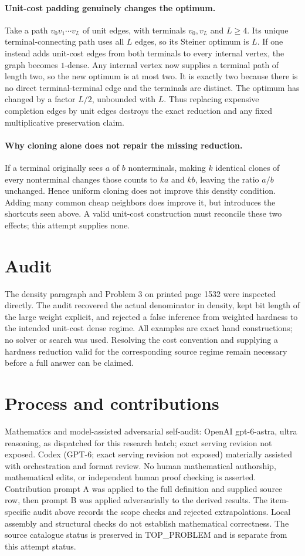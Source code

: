 \documentclass[11pt]{article}
\begin{document}
\paragraph{Unit-cost padding genuinely changes the optimum.}
Take a path $v_0v_1\cdots v_L$ of unit edges, with terminals
$v_0,v_L$ and $L\ge4$. Its unique terminal-connecting path
uses all $L$ edges, so its Steiner optimum is $L$.
If one instead adds unit-cost edges from both terminals to every
internal vertex, the graph becomes $1$-dense. Any internal vertex
now supplies a terminal path of length two, so the new optimum is
at most two. It is exactly two because there is no direct
terminal-terminal edge and the terminals are distinct. The optimum
has changed by a factor $L/2$, unbounded with $L$.
Thus replacing expensive completion edges by unit edges destroys
the exact reduction and any fixed multiplicative preservation claim.

\paragraph{Why cloning alone does not repair the missing reduction.}
If a terminal originally sees $a$ of $b$ nonterminals, making
$k$ identical clones of every nonterminal changes those counts to
$ka$ and $kb$, leaving the ratio $a/b$ unchanged. Hence uniform
cloning does not improve this density condition. Adding many common
cheap neighbors does improve it, but introduces the shortcuts seen
above. A valid unit-cost construction must reconcile these two
effects; this attempt supplies none.

\section{Audit}
The density paragraph and Problem 3 on printed page 1532 were
inspected directly. The audit recovered the actual denominator in
density, kept bit length of the large weight explicit, and rejected
a false inference from weighted hardness to the intended unit-cost
dense regime. All examples are exact hand constructions; no solver
or search was used. Resolving the cost convention and supplying a
hardness reduction valid for the corresponding source regime remain
necessary before a full answer can be claimed.

\section{Process and contributions}
Mathematics and model-assisted adversarial self-audit: OpenAI gpt-6-astra, ultra reasoning, as dispatched for this research batch; exact serving revision not exposed. Codex (GPT-6; exact serving revision not exposed) materially assisted with orchestration and format review. No human mathematical authorship, mathematical edits, or independent human proof checking is asserted.
Contribution prompt A was applied to the full definition and supplied source row, then prompt B was applied adversarially to the derived results. The item-specific audit above records the scope checks and rejected extrapolations. Local assembly and structural checks do not establish mathematical correctness. The source catalogue status is preserved in TOP\_PROBLEM and is separate from this attempt status.
\end{document}
